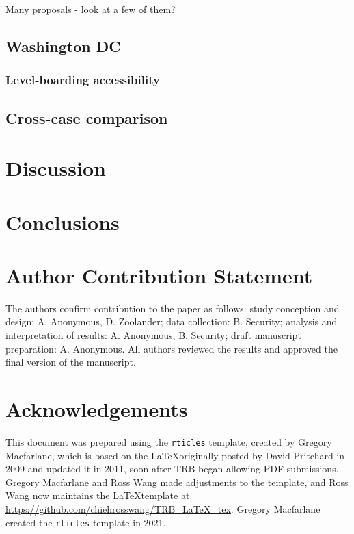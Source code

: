\documentclass[numbered]{trbunofficial}
\begin{document}
Many proposals - look at a few of them?

\hypertarget{washington-dc}{%
\subsection{Washington DC}\label{washington-dc}}

\hypertarget{level-boarding-accessibility-2}{%
\subsubsection{Level-boarding
accessibility}\label{level-boarding-accessibility-2}}

\hypertarget{cross-case-comparison}{%
\subsection{Cross-case comparison}\label{cross-case-comparison}}

\hypertarget{discussion}{%
\section{Discussion}\label{discussion}}

\hypertarget{conclusions}{%
\section{Conclusions}\label{conclusions}}

\hypertarget{author-contribution-statement}{%
\section{Author Contribution
Statement}\label{author-contribution-statement}}

The authors confirm contribution to the paper as follows: study
conception and design: A. Anonymous, D. Zoolander; data collection: B.
Security; analysis and interpretation of results: A. Anonymous, B.
Security; draft manuscript preparation: A. Anonymous. All authors
reviewed the results and approved the final version of the manuscript.

\hypertarget{acknowledgements}{%
\section{Acknowledgements}\label{acknowledgements}}

This document was prepared using the \texttt{rticles} template, created
by Gregory Macfarlane, which is based on the \LaTeX originally posted by
David Pritchard in 2009 and updated it in 2011, soon after TRB began
allowing PDF submissions. Gregory Macfarlane and Ross Wang made
adjustments to the template, and Ross Wang now maintains the
\LaTeX template at \url{https://github.com/chiehrosswang/TRB_LaTeX_tex}.
Gregory Macfarlane created the \texttt{rticles} template in 2021.

\newpage
\renewcommand\refname{References}

\end{document}
